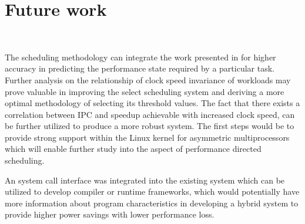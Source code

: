 \chapter{Future work}~\label{chap:future}

The scheduling methodology can integrate the work presented in \cite{PredictionModel}
for higher accuracy in predicting the performance state required by a particular task. 
Further analysis on the relationship of clock speed invariance of workloads may prove
valuable in improving the select scheduling system and deriving a more optimal methodology
of selecting its threshold values. 
The fact that there exists a correlation between
IPC and speedup achievable with increased clock speed, can be further utilized to produce a more robust system. 
The first steps would be to provide strong support within the Linux kernel for asymmetric
multiprocessors which will enable further study into the aspect of performance
directed scheduling. 

An system call interface was integrated into the existing system which can be utilized 
to develop compiler or runtime frameworks, which would potentially have more information
about program characteristics in developing a hybrid system to provide higher power savings
with lower performance loss. 